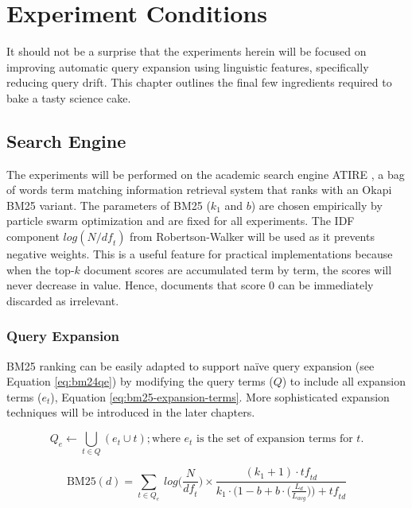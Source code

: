 \chapter{Experiment Conditions}
\label{chap:experiment-conditions}

It should not be a surprise that the experiments herein will be focused on improving automatic query expansion using linguistic features, specifically reducing query drift. This chapter outlines the final few ingredients required to bake a tasty science cake.

\section{Search Engine}
The experiments will be performed on the academic search engine ATIRE \cite{Trotman:2012:OSI:2422256.2422269}, a bag of words term matching information retrieval system that ranks with an Okapi BM25 variant. The parameters of BM25 ($k_1$ and $b$) are chosen empirically by particle swarm optimization \cite{Trotman:2014:IBL:2682862.2682863} and are fixed for all experiments. The IDF component $log ({N} / {\mathit{df}_{\!\!t}} )$ from Robertson-Walker \cite{Lee:2007:IRS:1277741.1277891} will be used as it prevents negative weights. This is a useful feature for practical implementations because when the top-$k$ document scores are accumulated term by term, the scores will never decrease in value. Hence, documents that score 0 can be immediately discarded as irrelevant.

\subsection{Query Expansion}
BM25 ranking can be easily adapted to support na{\"i}ve query expansion (see Equation \ref{eq:bm24qe}) by modifying the query terms ($Q$) to include all expansion terms ($e_t$), Equation \ref{eq:bm25-expansion-terms}. More sophisticated expansion techniques will be introduced in the later chapters.

\begin{equation}
	Q_{e} \leftarrow \bigcup_{t \in Q} ( e_t \cup t ) ; \text{where } e_t \text{ is the set of expansion terms for } t.
	\label{eq:bm25-expansion-terms}
\end{equation}


\begin{equation}
	\text{BM25}(d) = \sum_{t \in Q_{e}} \: log \Big( \frac{N}{\mathit{df}_{\!\!t}} \Big) \times \frac{(k_1 + 1) \cdot \mathit{tf}_{\!\!td}}{k_1 \cdot \Big(1-b + b \cdot \Big(\frac{L_d}{L_{avg}}\Big) \Big) + \mathit{tf}_{\!\!td}}
	\label{eq:bm24qe}
\end{equation}

